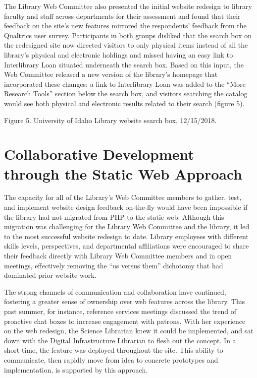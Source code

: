 \documentclass{book}
\begin{document}
The Library Web Committee also presented the initial website redesign to
library faculty and staff across departments for their assessment and found
that their feedback on the site's new features mirrored the respondents'
feedback from the Qualtrics user survey. Participants in both groups disliked
that the search box on the redesigned site now directed visitors to only
physical items instead of all the library's physical and electronic holdings
and missed having an easy link to Interlibrary Loan situated underneath the
search box. Based on this input, the Web Committee released a new version of
the library's homepage that incorporated these changes: a link to Interlibrary
Loan was added to the ``More Research Tools'' section below the search box,
and visitors searching the catalog would see both physical and electronic
results related to their search (figure 5).

Figure 5. University of Idaho Library website search box, 12/15/2018.

\hypertarget{collaborative-development-through-the-static-web-approach}{%
\section{Collaborative Development through the Static Web
Approach}\label{collaborative-development-through-the-static-web-approach}}

The capacity for all of the Library's Web Committee members to gather, test,
and implement website design feedback on-the-fly would have been impossible if
the library had not migrated from PHP to the static web. Although this
migration was challenging for the Library Web Committee and the library, it
led to the most successful website redesign to date. Library employees with
different skills levels, perspectives, and departmental affiliations were
encouraged to share their feedback directly with Library Web Committee members
and in open meetings, effectively removing the ``us versus them'' dichotomy
that had dominated prior website work.

The strong channels of communication and collaboration have continued,
fostering a greater sense of ownership over web features across the library.
This past summer, for instance, reference services meetings discussed the
trend of proactive chat boxes to increase engagement with patrons. With her
experience on the web redesign, the Science Librarian knew it could be
implemented, and sat down with the Digital Infrastructure Librarian to flesh
out the concept. In a short time, the feature was deployed throughout the
site. This ability to communicate, then rapidly move from idea to concrete
prototypes and implementation, is supported by this approach.
\end{document}
